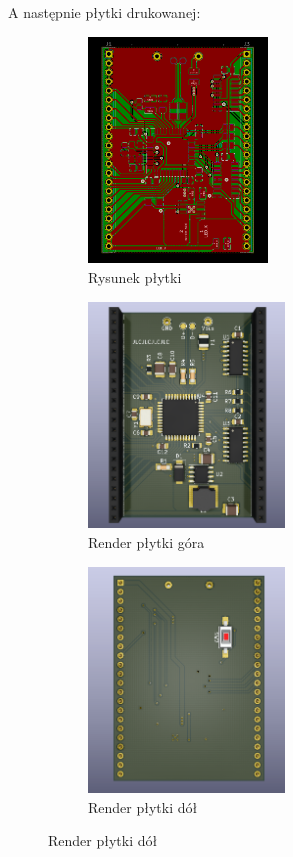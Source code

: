 \documentclass{article}
\begin{document}
    \newpage
    A następnie płytki drukowanej:
    \begin{figure}[h]
        \centering
        \begin{subfigure}{0.3\textwidth}
            \centering
            \includegraphics[height=6cm]{pcb.png} 
            \caption{Rysunek płytki}
            \label{fig:subim1}
            \end{subfigure}
        \begin{subfigure}{0.3\textwidth}
            \centering
            \includegraphics[height=6cm]{pcb2}
            \caption{Render płytki góra}
            \label{fig:subim2}
        \end{subfigure}
        \begin{subfigure}{0.3\textwidth}
            \centering
            \includegraphics[height=6cm]{pcb3}
            \caption{Render płytki dół}
            \label{fig:subim3}
        \end{subfigure}
        \end{figure}
\end{document}

